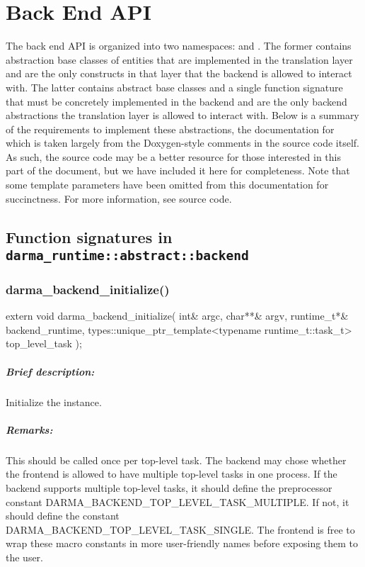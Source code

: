 
\chapter{Back End API}
\label{chap:back_end}

The back end API is organized into two namespaces:
 and
.  The former contains
abstraction base classes of entities that are implemented in the translation
layer and are the only constructs in that layer that the backend is
allowed to interact with.  The latter contains abstract base classes and a
single function signature that must be concretely implemented in the backend and
are the only backend abstractions the translation layer is allowed to interact
with.  Below is a summary of the requirements to implement these abstractions,
the documentation for which is taken largely from the Doxygen-style comments in
the source code itself.  As such, the source code may be a better resource for
those interested in this part of the document, but we have included it here for
completeness.  Note that some template parameters have been omitted from this
documentation for succinctness.  For more information, see source code.

\section{Function signatures in {\tt darma\_runtime::abstract::backend}}

\subsection{darma\_backend\_initialize()}
\begin{CppCode}
extern void
darma_backend_initialize(
  int& argc, char**& argv,
  runtime_t*& backend_runtime,
  types::unique_ptr_template<typename runtime_t::task_t> top_level_task
);
\end{CppCode}

\paragraph{Brief description:} Initialize the  instance.
 
\paragraph{Remarks:} This should be called once per top-level task.  The backend may chose whether
  the frontend is allowed to have multiple top-level tasks in one process.  If the backend
   supports multiple top-level tasks, it should define the preprocessor constant
   DARMA\_BACKEND\_TOP\_LEVEL\_TASK\_MULTIPLE.  If not, it should define the constant
   DARMA\_BACKEND\_TOP\_LEVEL\_TASK\_SINGLE.  The frontend is free to wrap these macro constants
   in more user-friendly names before exposing them to the user.
 

